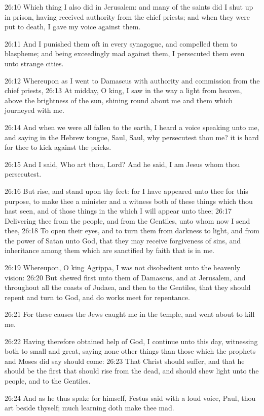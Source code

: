 26:10 Which thing I also did in Jerusalem: and many of the saints did
I shut up in prison, having received authority from the chief priests;
and when they were put to death, I gave my voice against them.

26:11 And I punished them oft in every synagogue, and compelled them
to blaspheme; and being exceedingly mad against them, I persecuted
them even unto strange cities.

26:12 Whereupon as I went to Damascus with authority and commission
from the chief priests, 26:13 At midday, O king, I saw in the way a
light from heaven, above the brightness of the sun, shining round
about me and them which journeyed with me.

26:14 And when we were all fallen to the earth, I heard a voice
speaking unto me, and saying in the Hebrew tongue, Saul, Saul, why
persecutest thou me? it is hard for thee to kick against the pricks.

26:15 And I said, Who art thou, Lord? And he said, I am Jesus whom
thou persecutest.

26:16 But rise, and stand upon thy feet: for I have appeared unto thee
for this purpose, to make thee a minister and a witness both of these
things which thou hast seen, and of those things in the which I will
appear unto thee; 26:17 Delivering thee from the people, and from the
Gentiles, unto whom now I send thee, 26:18 To open their eyes, and to
turn them from darkness to light, and from the power of Satan unto
God, that they may receive forgiveness of sins, and inheritance among
them which are sanctified by faith that is in me.

26:19 Whereupon, O king Agrippa, I was not disobedient unto the
heavenly vision: 26:20 But shewed first unto them of Damascus, and at
Jerusalem, and throughout all the coasts of Judaea, and then to the
Gentiles, that they should repent and turn to God, and do works meet
for repentance.

26:21 For these causes the Jews caught me in the temple, and went
about to kill me.

26:22 Having therefore obtained help of God, I continue unto this day,
witnessing both to small and great, saying none other things than
those which the prophets and Moses did say should come: 26:23 That
Christ should suffer, and that he should be the first that should rise
from the dead, and should shew light unto the people, and to the
Gentiles.

26:24 And as he thus spake for himself, Festus said with a loud voice,
Paul, thou art beside thyself; much learning doth make thee mad.

